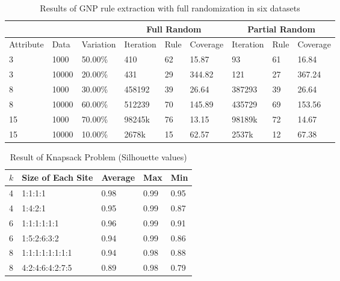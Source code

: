 \documentclass[fleqn,10pt,twocolumn]{SICE14}
\begin{document}
\begin{table}[tb]
\caption{\label{gnp-rule-extraction-result-full}Results of GNP rule extraction with full randomization in six datasets}
\begin{center}
\begin{tabular}{|l|l|l|l|l|l|l|l|l|}
\hline 
\multicolumn{3}{|l|}{} & \multicolumn{3}{c|}{Full Random} & \multicolumn{3}{c|}{Partial Random}\tabularnewline
\hline 
Attribute & Data & Variation & Iteration & Rule & Coverage & Iteration & Rule & Coverage\tabularnewline
\hline 
3 & 1000 & 50.00\% & 410 & 62 & 15.87 & 93 & 61 & 16.84\tabularnewline
\hline 
3 & 10000 & 20.00\% & 431 & 29 & 344.82 & 121 & 27 & 367.24\tabularnewline
\hline 
8 & 1000 & 30.00\% & 458192 & 39 & 26.64 & 387293 & 39 & 26.64\tabularnewline
\hline 
8 & 10000 & 60.00\% & 512239 & 70 & 145.89 & 435729 & 69 & 153.56\tabularnewline
\hline 
15 & 1000 & 70.00\% & 98245k & 76 & 13.15 & 98189k & 72 & 14.67\tabularnewline
\hline 
15 & 10000 & 10.00\% & 2678k & 15 & 62.57 & 2537k & 12 & 67.38\tabularnewline
\hline 
\end{tabular}
\par\end{center}
\vspace{1em}
\end{table}

\begin{table}[tb]
\caption{\label{knapsack-result}Result of Knapsack Problem (Silhouette values)}
\begin{tabular}{|l|l|l|l|l|}
\hline 
$k$ & Size of Each Site & Average & Max & Min\tabularnewline
\hline 
4 & 1:1:1:1 & 0.98 & 0.99 & 0.95\tabularnewline
\hline 
4 & 1:4:2:1 & 0.95 & 0.99 & 0.87\tabularnewline
\hline 
6 & 1:1:1:1:1:1 & 0.96 & 0.99 & 0.91\tabularnewline
\hline 
6 & 1:5:2:6:3:2 & 0.94 & 0.99 & 0.86\tabularnewline
\hline 
8 & 1:1:1:1:1:1:1:1 & 0.94 & 0.98 & 0.88\tabularnewline
\hline 
8 & 4:2:4:6:4:2:7:5 & 0.89 & 0.98 & 0.79\tabularnewline
\hline 
\end{tabular}
\end{table}
\end{document}
